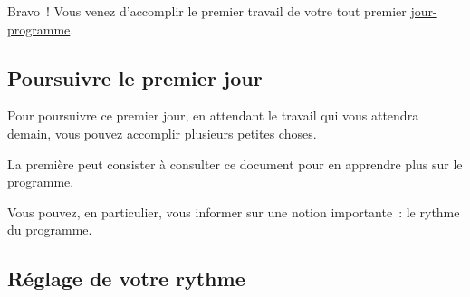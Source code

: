 Bravo~{}! Vous venez d'accomplir le premier travail de votre tout premier \hyperlink{explicationjourprogrammejourreel}{jour-programme}.

\subsection{Poursuivre le premier jour}\hypertarget{poursuivre-le-premier-jour}{}\label{poursuivre-le-premier-jour}

Pour poursuivre ce premier jour, en attendant le travail qui vous attendra demain, vous pouvez accomplir plusieurs petites choses.

La première peut consister à consulter ce document pour en apprendre plus sur le programme.

Vous pouvez, en particulier, vous informer sur une notion importante~{}: le rythme du programme.

\subsection{Réglage de votre rythme}\hypertarget{rglage-de-votre-rythme}{}\label{rglage-de-votre-rythme}

